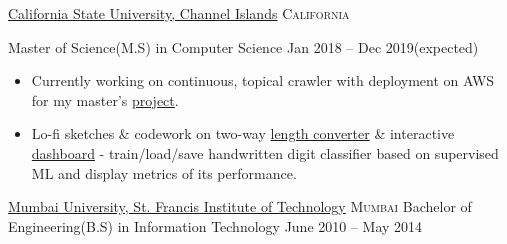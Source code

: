 \documentclass[11pt,a4paper]{article}
\begin{document}
\headedsection
  {\href{https://www.csuci.edu/}{California State University, Channel Islands}}
  {\textsc{California}} {%
  \headedsubsection
    {Master of Science(M.S) in Computer Science}
    {Jan 2018 -- Dec 2019(expected)}
    {
      \begin{itemize}
        \item Currently working on continuous, topical crawler with deployment on AWS for my master's \href{https://github.com/rihbyne/csuci-mscs-thesis-dist-web-crawler/blob/master/initial-writeup/initialwriteup.pdf}{project}.
        \item Lo-fi sketches \& codework on two-way \href{https://github.com/rihbyne/linear-length-converter}{length converter} \&  interactive \href{https://github.com/rihbyne/watch-ml-behave}{dashboard} - train/load/save handwritten digit classifier based on supervised ML and display metrics of its performance.
      \end{itemize}
    }
  }

\headedsection
  {\href{http://www.mu.ac.in/}{Mumbai University, St. Francis Institute of Technology}}
  {\textsc{Mumbai}} {%
  \headedsubsection
    {Bachelor of Engineering(B.S) in Information Technology}
    {June 2010 -- May 2014}
    {}
}
\end{document}

